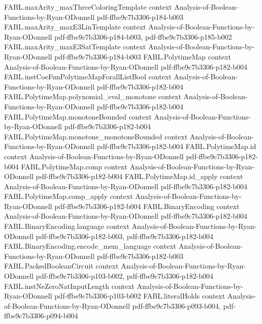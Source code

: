 \begin{theorem}
\proofstep
  {FABL.maxArity_maxThreeColoringTemplate}
  {context}
  {Analysis-of-Boolean-Functions-by-Ryan-ODonnell}
  {pdf-ffbe9c7b3306-p184-b003}
\proofstep
  {FABL.maxArity_maxE3LinTemplate}
  {context}
  {Analysis-of-Boolean-Functions-by-Ryan-ODonnell}
  {pdf-ffbe9c7b3306-p184-b003,
    pdf-ffbe9c7b3306-p185-b002}
\proofstep
  {FABL.maxArity_maxE3SatTemplate}
  {context}
  {Analysis-of-Boolean-Functions-by-Ryan-ODonnell}
  {pdf-ffbe9c7b3306-p184-b003}
\proofstep
  {FABL.PolytimeMap}
  {context}
  {Analysis-of-Boolean-Functions-by-Ryan-ODonnell}
  {pdf-ffbe9c7b3306-p182-b004}
\proofstep
  {FABL.instCoeFunPolytimeMapForallListBool}
  {context}
  {Analysis-of-Boolean-Functions-by-Ryan-ODonnell}
  {pdf-ffbe9c7b3306-p182-b004}
\proofstep
  {FABL.PolytimeMap.polynomial_eval_monotone}
  {context}
  {Analysis-of-Boolean-Functions-by-Ryan-ODonnell}
  {pdf-ffbe9c7b3306-p182-b004}
\proofstep
  {FABL.PolytimeMap.monotoneBounded}
  {context}
  {Analysis-of-Boolean-Functions-by-Ryan-ODonnell}
  {pdf-ffbe9c7b3306-p182-b004}
\proofstep
  {FABL.PolytimeMap.monotone_monotoneBounded}
  {context}
  {Analysis-of-Boolean-Functions-by-Ryan-ODonnell}
  {pdf-ffbe9c7b3306-p182-b004}
\proofstep
  {FABL.PolytimeMap.id}
  {context}
  {Analysis-of-Boolean-Functions-by-Ryan-ODonnell}
  {pdf-ffbe9c7b3306-p182-b004}
\proofstep
  {FABL.PolytimeMap.comp}
  {context}
  {Analysis-of-Boolean-Functions-by-Ryan-ODonnell}
  {pdf-ffbe9c7b3306-p182-b004}
\proofstep
  {FABL.PolytimeMap.id_apply}
  {context}
  {Analysis-of-Boolean-Functions-by-Ryan-ODonnell}
  {pdf-ffbe9c7b3306-p182-b004}
\proofstep
  {FABL.PolytimeMap.comp_apply}
  {context}
  {Analysis-of-Boolean-Functions-by-Ryan-ODonnell}
  {pdf-ffbe9c7b3306-p182-b004}
\proofstep
  {FABL.BinaryEncoding}
  {context}
  {Analysis-of-Boolean-Functions-by-Ryan-ODonnell}
  {pdf-ffbe9c7b3306-p182-b004}
\proofstep
  {FABL.BinaryEncoding.language}
  {context}
  {Analysis-of-Boolean-Functions-by-Ryan-ODonnell}
  {pdf-ffbe9c7b3306-p182-b003,
    pdf-ffbe9c7b3306-p182-b004}
\proofstep
  {FABL.BinaryEncoding.encode_mem_language}
  {context}
  {Analysis-of-Boolean-Functions-by-Ryan-ODonnell}
  {pdf-ffbe9c7b3306-p182-b003}
\proofstep
  {FABL.PackedBooleanCircuit}
  {context}
  {Analysis-of-Boolean-Functions-by-Ryan-ODonnell}
  {pdf-ffbe9c7b3306-p103-b002,
    pdf-ffbe9c7b3306-p182-b004}
\proofstep
  {FABL.instNeZeroNatInputLength}
  {context}
  {Analysis-of-Boolean-Functions-by-Ryan-ODonnell}
  {pdf-ffbe9c7b3306-p103-b002}
\proofstep
  {FABL.literalHolds}
  {context}
  {Analysis-of-Boolean-Functions-by-Ryan-ODonnell}
  {pdf-ffbe9c7b3306-p093-b004,
    pdf-ffbe9c7b3306-p094-b004}

\end{theorem}
